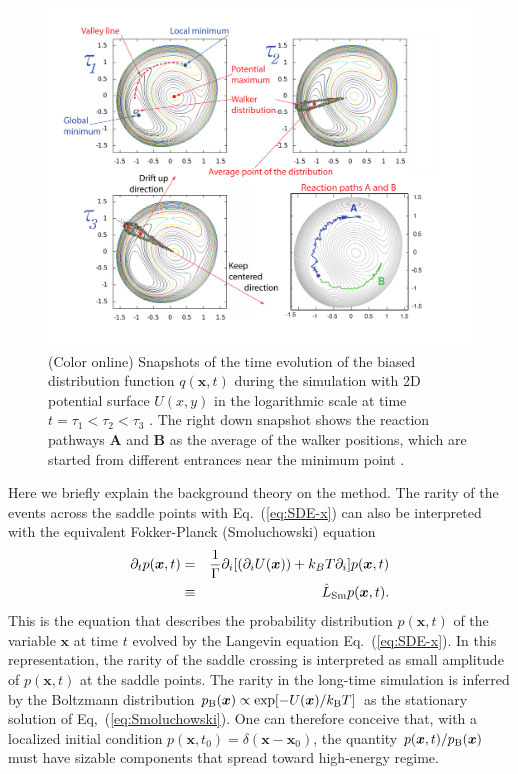 \documentclass[preprint,12pt]{elsarticle}
\begin{document}
\begin{figure}[!t]
 \begin{center}
 \includegraphics[scale=0.36]{valleytrack.pdf}
  \caption{(Color online)   Snapshots of the time evolution of the biased distribution function $q({\bm x},t)$ during the simulation with 2D potential surface $U(x,y)$ 
    in the logarithmic scale at time $t=\tau_1 < \tau_2 < \tau_3 $ \cite{Nagornov}.  The right down snapshot shows the reaction pathways {\bf A} and {\bf B} as the average of the walker positions, which are started from different entrances near the minimum point \cite{Akashi}. }
  \label{fig:valleytrack}
 \end{center}
\end{figure}



Here we briefly explain the background theory on the method. The rarity of the events across the saddle points with Eq.~(\ref{eq:SDE-x}) can also be interpreted with the equivalent Fokker-Planck (Smoluchowski) equation~\cite{Gardiner-book}
\begin{eqnarray}
\partial_t p({\bm x},t) &=& \frac{1}{\Gamma}\partial_i [ (\partial_{i}U({\bm x})) + k_{B}T \partial_i]p({\bm x},t)
\\
&\equiv& \hat{L}_{\rm Sm}p({\bm x},t)
.
\label{eq:Smoluchowski}
\end{eqnarray}
This is the equation that describes the probability distribution $p({\bm x},t)$ of the variable ${\bm x}$ at time $t$ evolved by the Langevin equation Eq.~(\ref{eq:SDE-x}). In this representation, the rarity of the saddle crossing is interpreted as small amplitude of $p({\bm x}, t)$ at the saddle points. The rarity in the long-time simulation is inferred by the Boltzmann distribution $p_{\rm B}({\bm x})\propto {\rm exp}[-U({\bm x})/k_{\rm B}T]$ as the stationary solution of Eq,~(\ref{eq:Smoluchowski}). One can therefore conceive that, with a localized initial condition $p({\bm x}, t_{0})=\delta({\bm x}-{\bm x}_{0})$, the quantity $p({\bm x},t)/p_{\rm B}({\bm x})$ must have sizable components that spread toward high-energy regime. 
\end{document}

